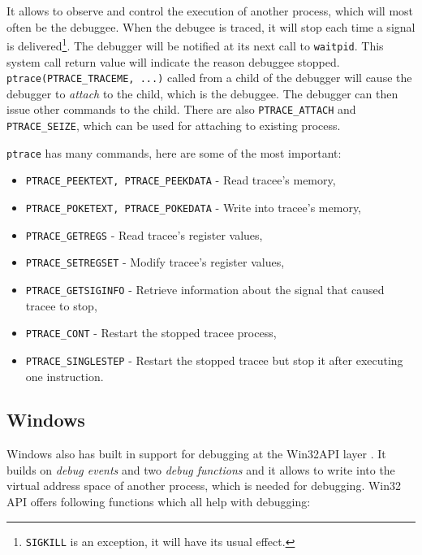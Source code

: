 It allows to observe and control the execution of another process, which will most often be the debuggee. When the debugee is traced, it will stop each time a signal is delivered\footnote{\lstinline{SIGKILL} is an exception, it will have its usual effect.}. The debugger will be notified at its next call to \lstinline{waitpid}. This system call return value will indicate the reason debuggee stopped. \lstinline{ptrace(PTRACE_TRACEME, ...)} called from a child of the debugger will cause the debugger to \textit{attach} to the child, which is the debuggee. The debugger can then issue other commands to the child. There are also \lstinline{PTRACE_ATTACH} and \lstinline{PTRACE_SEIZE}, which can be used for attaching to existing process.

\lstinline{ptrace} has many commands, here are some of the most important:
\begin{itemize}
    \item \lstinline{PTRACE_PEEKTEXT, PTRACE_PEEKDATA} - Read tracee's memory,
    \item \lstinline{PTRACE_POKETEXT, PTRACE_POKEDATA} - Write into tracee's memory,
    \item \lstinline{PTRACE_GETREGS} - Read tracee's register values,
    \item \lstinline{PTRACE_SETREGSET} - Modify tracee's register values,
    \item \lstinline{PTRACE_GETSIGINFO} - Retrieve information about the signal that caused tracee to stop,
    \item \lstinline{PTRACE_CONT} - Restart the stopped tracee process,
    \item \lstinline{PTRACE_SINGLESTEP} - Restart the stopped tracee but stop it after executing one instruction.
\end{itemize}


\subsection{Windows}
Windows also has built in support for debugging at the Win32API layer \cite{windows-msdn-debugging-api, windows-press-debugging-api}. It builds on \textit{debug events} and two \textit{debug functions} and it allows to write into the virtual address space of another process, which is needed for debugging. Win32 API offers following functions which all help with debugging:

